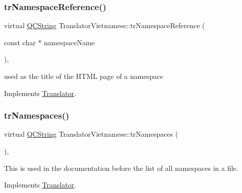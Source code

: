 \mbox{\label{class_translator_vietnamese_a2f2607ec93d8cf5d9b5e42bf96c655c7}} 
\subsubsection{\texorpdfstring{trNamespaceReference()}{trNamespaceReference()}}
{\footnotesize\ttfamily virtual \mbox{\hyperlink{class_q_c_string}{Q\+C\+String}} Translator\+Vietnamese\+::tr\+Namespace\+Reference (\begin{DoxyParamCaption}\item[{const char $\ast$}]{namespace\+Name }\end{DoxyParamCaption})\hspace{0.3cm}{\ttfamily [inline]}, {\ttfamily [virtual]}}

used as the title of the H\+T\+ML page of a namespace 

Implements \mbox{\hyperlink{class_translator}{Translator}}.

\mbox{\label{class_translator_vietnamese_a743f432bb5d4adef074bae10d3c0cda2}} 
\subsubsection{\texorpdfstring{trNamespaces()}{trNamespaces()}}
{\footnotesize\ttfamily virtual \mbox{\hyperlink{class_q_c_string}{Q\+C\+String}} Translator\+Vietnamese\+::tr\+Namespaces (\begin{DoxyParamCaption}{ }\end{DoxyParamCaption})\hspace{0.3cm}{\ttfamily [inline]}, {\ttfamily [virtual]}}

This is used in the documentation before the list of all namespaces in a file. 

Implements \mbox{\hyperlink{class_translator}{Translator}}.

\mbox{\label{class_translator_vietnamese_a888bc508ba4d11c3700aedc47836dc53}} 
